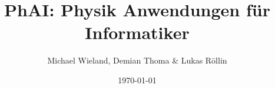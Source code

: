 \documentclass[
a4paper,
oneside,
landscape, 
fontsize=8pt,
]{scrartcl}
\title{PhAI: Physik Anwendungen für Informatiker}
\author{Michael Wieland, Demian Thoma \& Lukas Röllin}
\date{\today}
\begin{document}
\maketitle


\begin{multicols*}{2}
	
\tableofcontents
\clearpage
	


\clearpage




\clearpage



\clearpage



\clearpage




\end{multicols*}
\end{document}
